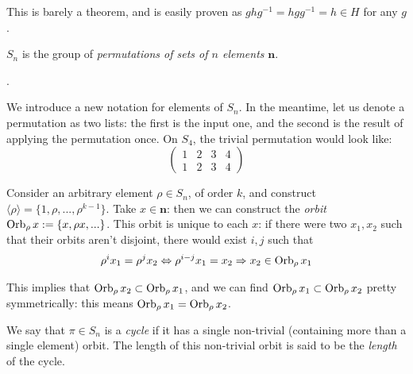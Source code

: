 This is barely a theorem, and is easily proven as $ghg^{-1} = hgg^{-1} = h \in H$ for any $g$. 


\begin{definition}
  $S_n$ is the group of \emph{permutations of sets of $n$ elements} $\mathbf{n}$. 
\end{definition}


.

We introduce a new notation for elements of $S_n$. In the meantime, let us denote a permutation as two lists: the first is the input one, and the second is the result of applying the permutation once. On $S_4$, the trivial permutation would look like: 
\[
  \begin{pmatrix}
    1 & 2 & 3 & 4 \\
    1 & 2 & 3 & 4
  \end{pmatrix}
\]

Consider an arbitrary element $\rho \in S_n$, of order $k$, and construct $\langle \rho \rangle = \{1, \rho, ..., \rho^{k - 1}\}$. Take $x \in \mathbf{n}$: then we can construct the \emph{orbit} $\operatorname{Orb}_\rho x := \{x, \rho x, ...\}$. This orbit is unique to each $x$: if there were two $x_1, x_2$ such that their orbits aren't disjoint, there would exist $i, j$ such that 
\begin{gather*}
  \rho^ix_1 = \rho^jx_2 \Leftrightarrow \rho^{i - j}x_1 = x_2 \Rightarrow x_2 \in \operatorname{Orb}_\rho x_1
\end{gather*}

This implies that $\operatorname{Orb}_\rho x_2 \subset \operatorname{Orb}_\rho x_1$, and we can find $\operatorname{Orb}_\rho x_1 \subset \operatorname{Orb}_\rho x_2$ pretty symmetrically: this means $\operatorname{Orb}_\rho x_1 = \operatorname{Orb}_\rho x_2$.

\begin{definition}
  We say that $\pi \in S_n$ is a \emph{cycle} if it has a single non-trivial (containing more than a single element) orbit. The length of this non-trivial orbit is said to be the \emph{length} of the cycle.
\end{definition}

